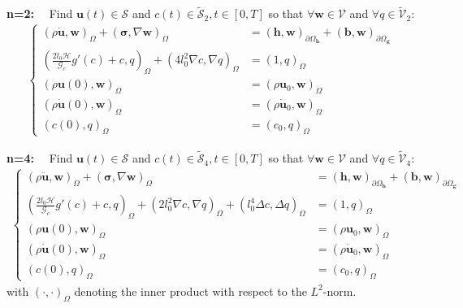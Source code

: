 \textbf{n=2:}$\quad$ Find $\mathbf{u}\left(t\right)\in\bm{\mathcal{S}}$ and $c\left(t\right)\in\tilde{\mathcal{S}}_{2},t\in\left[0,T\right]$ so that $\forall \mathbf{w}\in\bm{\mathcal{V}}$ and $\forall q\in\tilde{\mathcal{V}}_{2}$:
\begin{equation} \label{eq:weak_2}
\begin{aligned}
\left\{\begin{alignedat}{2}
	\left(\rho \ddot{\mathbf{u}},\mathbf{w}\right)_{\Omega} + \left(\bm{\sigma},\nabla\mathbf{w}\right)_{\Omega} &= \left(\mathbf{h},\mathbf{w}\right)_{\partial\Omega_{\mathbf{h}}} + \left(\mathbf{b},\mathbf{w}\right)_{\partial\Omega_{\mathbf{g}}} \\
	\left(\frac{2l_{0}\mathcal{H}}{\mathcal{G}_{c}}g'\left(c\right) + c,q\right)_{\Omega} + \left(4l_{0}^{2}\nabla c,\nabla q\right)_{\Omega} &= \left(1,q\right)_{\Omega} \\
	\left(\rho\mathbf{u}\left(0\right),\mathbf{w}\right)_{\Omega} &= \left(\rho\mathbf{u}_{0},\mathbf{w}\right)_{\Omega} \\
	\left(\rho\dot{\mathbf{u}}\left(0\right),\mathbf{w}\right)_{\Omega} &= \left(\rho\dot{\mathbf{u}}_{0},\mathbf{w}\right)_{\Omega} \\
	\left(c\left(0\right),q\right)_{\Omega} &= \left(c_{0},q\right)_{\Omega}
\end{alignedat}\right.
\end{aligned}
\end{equation}

\textbf{n=4:}$\quad$ Find $\mathbf{u}\left(t\right)\in\bm{\mathcal{S}}$ and $c\left(t\right)\in\tilde{\mathcal{S}}_{4},t\in\left[0,T\right]$ so that $\forall \mathbf{w}\in\bm{\mathcal{V}}$ and $\forall q\in\tilde{\mathcal{V}}_{4}$:
\begin{equation} \label{eq:weak_4}
\begin{aligned}
\left\{\begin{alignedat}{2}
	\left(\rho \ddot{\mathbf{u}},\mathbf{w}\right)_{\Omega} + \left(\bm{\sigma},\nabla\mathbf{w}\right)_{\Omega} &= \left(\mathbf{h},\mathbf{w}\right)_{\partial\Omega_{\mathbf{h}}} + \left(\mathbf{b},\mathbf{w}\right)_{\partial\Omega_{\mathbf{g}}} \\
	\left(\frac{2l_{0}\mathcal{H}}{\mathcal{G}_{c}}g'\left(c\right) + c,q\right)_{\Omega} + \left(2l_{0}^{2}\nabla c,\nabla q\right)_{\Omega} + \left(l_{0}^{4}\Delta c,\Delta q\right)_{\Omega}&= \left(1,q\right)_{\Omega} \\
	\left(\rho\mathbf{u}\left(0\right),\mathbf{w}\right)_{\Omega} &= \left(\rho\mathbf{u}_{0},\mathbf{w}\right)_{\Omega} \\
	\left(\rho\dot{\mathbf{u}}\left(0\right),\mathbf{w}\right)_{\Omega} &= \left(\rho\dot{\mathbf{u}}_{0},\mathbf{w}\right)_{\Omega} \\
	\left(c\left(0\right),q\right)_{\Omega} &= \left(c_{0},q\right)_{\Omega}
\end{alignedat}\right.
\end{aligned}
\end{equation}
with $\left(\cdot,\cdot\right)_{\Omega}$ denoting the inner product with respect to the $L^{2}$-norm.

